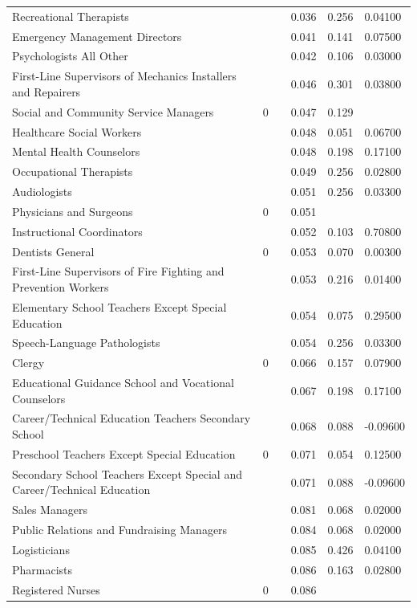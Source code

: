 \documentclass[11pt]{report}
\numberwithin{equation}{chapter}
\begin{document}
\begin{spacing}{2}
\begin{longtable}{ p{} p{} p{}  p{}  p{}  p{} }
Recreational Therapists	&		&	&	0.036	&	0.256	&	0.04100	\\
Emergency Management Directors	&		&	&	0.041	&	0.141	&	0.07500	\\
Psychologists All Other	&		&	&	0.042	&	0.106	&	0.03000	\\
First-Line Supervisors of Mechanics Installers and Repairers	&		&	&	0.046	&	0.301	&	0.03800	\\
Social and Community Service Managers	&	0	&	&	0.047	&	0.129	&		\\
Healthcare Social Workers	&		&	&	0.048	&	0.051	&	0.06700	\\
Mental Health Counselors	&		&	&	0.048	&	0.198	&	0.17100	\\
Occupational Therapists	&		&	&	0.049	&	0.256	&	0.02800	\\
Audiologists	&		&	&	0.051	&	0.256	&	0.03300	\\
Physicians and Surgeons	&	0	&	&	0.051	&		&		\\
Instructional Coordinators	&		&	&	0.052	&	0.103	&	0.70800	\\
Dentists General	&	0	&	&	0.053	&	0.070	&	0.00300	\\
First-Line Supervisors of Fire Fighting and Prevention Workers	&		&	&	0.053	&	0.216	&	0.01400	\\
Elementary School Teachers Except Special Education	&		&	&	0.054	&	0.075	&	0.29500	\\
Speech-Language Pathologists	&		&	&	0.054	&	0.256	&	0.03300	\\
Clergy	&	0	&	&	0.066	&	0.157	&	0.07900	\\
Educational Guidance School and Vocational Counselors	&		&	&	0.067	&	0.198	&	0.17100	\\
Career/Technical Education Teachers Secondary School	&		&	&	0.068	&	0.088	&	-0.09600	\\
Preschool Teachers Except Special Education	&	0	&	&	0.071	&	0.054	&	0.12500	\\
Secondary School Teachers Except Special and Career/Technical Education	&		&	&	0.071	&	0.088	&	-0.09600	\\
Sales Managers	&		&	&	0.081	&	0.068	&	0.02000	\\
Public Relations and Fundraising Managers	&		&	&	0.084	&	0.068	&	0.02000	\\
Logisticians	&		&	&	0.085	&	0.426	&	0.04100	\\
Pharmacists	&		&	&	0.086	&	0.163	&	0.02800	\\
Registered Nurses	&	0	&	&	0.086	&		&		\\

\end{longtable}
\end{spacing}
\end{document}
